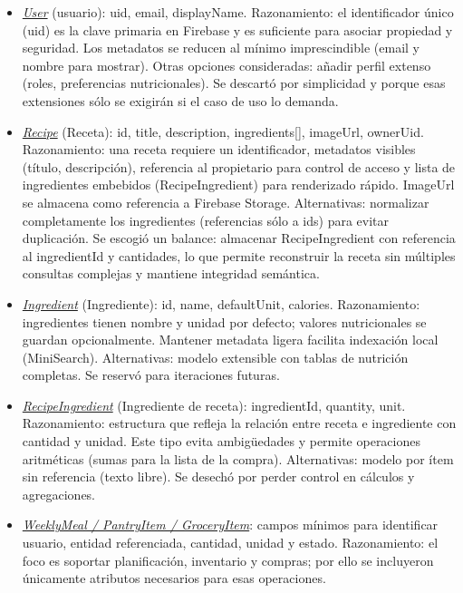 \documentclass[twoside, openright, 11pt]{report}
\begin{document}
		\begin{itemize}
			\item \textit{\underline{User}} (usuario): uid, email, displayName.  
			Razonamiento: el identificador único (uid) es la clave primaria en Firebase y es suficiente para asociar propiedad y seguridad. Los metadatos se reducen al mínimo imprescindible (email y nombre para mostrar).
			Otras opciones consideradas: añadir perfil extenso (roles, preferencias nutricionales). Se descartó por simplicidad y porque esas extensiones sólo se exigirán si el caso de uso lo demanda.
			
			\item \textit{\underline{Recipe}} (Receta): id, title, description, ingredients[], imageUrl, ownerUid.  
			Razonamiento: una receta requiere un identificador, metadatos visibles (título, descripción), referencia al propietario para control de acceso y lista de ingredientes embebidos (RecipeIngredient) para renderizado rápido. ImageUrl se almacena como referencia a Firebase Storage.
			Alternativas: normalizar completamente los ingredientes (referencias sólo a ids) para evitar duplicación. Se escogió un balance: almacenar RecipeIngredient con referencia al ingredientId y cantidades, lo que permite reconstruir la receta sin múltiples consultas complejas y mantiene integridad semántica.
			
			\item \textit{\underline{Ingredient}} (Ingrediente): id, name, defaultUnit, calories.  
			Razonamiento: ingredientes tienen nombre y unidad por defecto; valores nutricionales se guardan opcionalmente. Mantener metadata ligera facilita indexación local (MiniSearch).
			Alternativas: modelo extensible con tablas de nutrición completas. Se reservó para iteraciones futuras.
			
			\item \textit{\underline{RecipeIngredient}} (Ingrediente de receta): ingredientId, quantity, unit.  
			Razonamiento: estructura que refleja la relación entre receta e ingrediente con cantidad y unidad. Este tipo evita ambigüedades y permite operaciones aritméticas (sumas para la lista de la compra).
			Alternativas: modelo por ítem sin referencia (texto libre). Se desechó por perder control en cálculos y agregaciones.
			
			\item \textit{\underline{WeeklyMeal / PantryItem / GroceryItem}}: campos mínimos para identificar usuario, entidad referenciada, cantidad, unidad y estado.  
			Razonamiento: el foco es soportar planificación, inventario y compras; por ello se incluyeron únicamente atributos necesarios para esas operaciones.
		\end{itemize}
	
\end{document}
